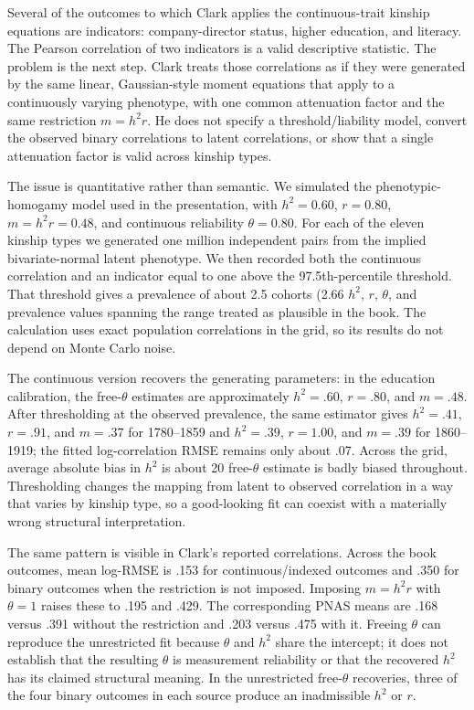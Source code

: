 \documentclass[12pt]{article}
\begin{document}
Several of the outcomes to which Clark applies the continuous-trait kinship
equations are indicators: company-director status, higher education, and
literacy. The Pearson correlation of two indicators is a valid descriptive
statistic. The problem is the next step. Clark treats those correlations as
if they were generated by the same linear, Gaussian-style moment equations
that apply to a continuously varying phenotype, with one common attenuation
factor and the same restriction $m=h^2r$. He does not specify a
threshold/liability model, convert the observed binary correlations to latent
correlations, or show that a single attenuation factor is valid across
kinship types.

The issue is quantitative rather than semantic. We simulated the
phenotypic-homogamy model used in the presentation, with $h^2=0.60$,
$r=0.80$, $m=h^2r=0.48$, and continuous reliability $\theta=0.80$. For
each of the eleven kinship types we generated one million independent pairs
from the implied bivariate-normal latent phenotype. We then recorded both
the continuous correlation and an indicator equal to one above the
97.5th-percentile threshold. That threshold gives a prevalence of about
2.5%
cohorts (2.66%
$h^2$, $r$, $\theta$, and prevalence values spanning the range treated as
plausible in the book. The calculation uses exact population correlations in
the grid, so its results do not depend on Monte Carlo noise.

The continuous version recovers the generating parameters: in the education
calibration, the free-$\theta$ estimates are approximately $h^2=.60$,
$r=.80$, and $m=.48$. After thresholding at the observed prevalence, the
same estimator gives $h^2=.41$, $r=.91$, and $m=.37$ for 1780--1859 and
$h^2=.39$, $r=1.00$, and $m=.39$ for 1860--1919; the fitted log-correlation
RMSE remains only about .07. Across the grid, average absolute bias in
$h^2$ is about 20%
free-$\theta$ estimate is badly biased throughout. Thresholding changes the
mapping from latent to observed correlation in a way that varies by kinship
type, so a good-looking fit can coexist with a materially wrong structural
interpretation.

The same pattern is visible in Clark's reported correlations. Across the
book outcomes, mean log-RMSE is .153 for continuous/indexed outcomes and
.350 for binary outcomes when the restriction is not imposed. Imposing
$m=h^2r$ with $\theta=1$ raises these to .195 and .429. The corresponding
PNAS means are .168 versus .391 without the restriction and .203 versus
.475 with it. Freeing $\theta$ can reproduce the unrestricted fit because
$\theta$ and $h^2$ share the intercept; it does not establish that the
resulting $\theta$ is measurement reliability or that the recovered $h^2$
has its claimed structural meaning. In the unrestricted free-$\theta$
recoveries, three of the four binary outcomes in each source produce an
inadmissible $h^2$ or $r$.
\end{document}
